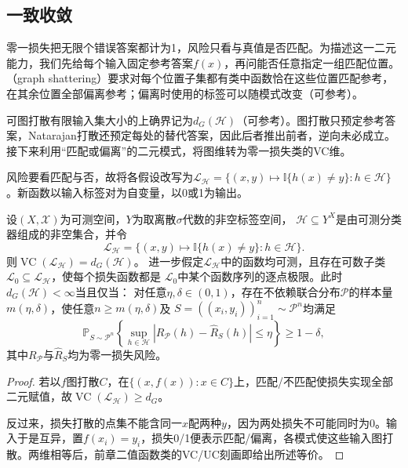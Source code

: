\subsection{一致收敛}

零一损失把无限个错误答案都计为1，风险只看与真值是否匹配。为描述这一二元能力，我们先给每个输入固定参考答案$f(x)$，再问能否任意指定一组匹配位置。（graph shattering）要求对每个位置子集都有类中函数恰在这些位置匹配参考，在其余位置全部偏离参考；偏离时使用的标签可以随模式改变（可参考）。

可图打散有限输入集大小的上确界记为$d_G(\mathcal H)$（可参考）。图打散只预定参考答案，Natarajan打散还预定每处的替代答案，因此后者推出前者，逆向未必成立。接下来利用“匹配或偏离”的二元模式，将图维转为零一损失类的VC维。

风险要看匹配与否，故将各假设改写为$\mathcal L_{\mathcal H}=\{(x,y)\mapsto\mathbb I\{h(x)\neq y\}:h\in\mathcal H\}$。新函数以输入标签对为自变量，以0或1为输出。

\begin{theorem}[图维与一致收敛]
\label{thm:graph-uniform-convergence}
设$(X,\mathcal X)$为可测空间，$Y$为取离散$\sigma$代数的非空标签空间，
$\mathcal H\subseteq Y^X$是由可测分类器组成的非空集合，并令
\[
 \mathcal L_{\mathcal H}
 =\{(x,y)\mapsto\mathbb I\{h(x)\neq y\}:h\in\mathcal H\}.
\]
则$\operatorname{VC}(\mathcal L_{\mathcal H})=d_G(\mathcal H)$。
进一步假定$\mathcal L_{\mathcal H}$中的函数均可测，且存在可数子类
$\mathcal L_0\subseteq\mathcal L_{\mathcal H}$，使每个损失函数都是
$\mathcal L_0$中某个函数序列的逐点极限。此时$d_G(\mathcal H)<\infty$当且仅当：
对任意$\eta,\delta\in(0,1)$，存在不依赖联合分布$\mathcal P$的样本量
$m(\eta,\delta)$，使任意$n\geq m(\eta,\delta)$及
$S=((x_i,y_i))_{i=1}^n\sim\mathcal P^n$均满足
\[
 \mathbb P_{S\sim\mathcal P^n}\left\{
 \sup_{h\in\mathcal H}|R_{\mathcal P}(h)-\hat R_S(h)|\leq\eta
 \right\}\geq1-\delta,
\]
其中$R_{\mathcal P}$与$\hat R_S$均为零一损失风险。
\end{theorem}

\begin{proof}
若以$f$图打散$C$，在$\{(x,f(x)):x\in C\}$上，匹配/不匹配使损失实现全部二元赋值，故$\operatorname{VC}(\mathcal L_{\mathcal H})\geq d_G$。

反过来，损失打散的点集不能含同一$x$配两种$y$，因为两处损失不可能同时为0。输入于是互异，置$f(x_i)=y_i$，损失0/1便表示匹配/偏离，各模式使这些输入图打散。两维相等后，前章二值函数类的VC/UC刻画即给出所述等价。
\end{proof}

